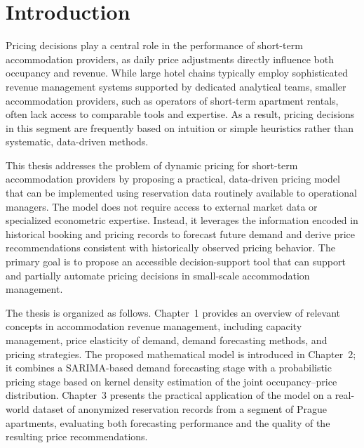 \chapter*{Introduction}

Pricing decisions play a central role in the performance of short-term accommodation providers, as daily price adjustments directly influence both occupancy and revenue. While large hotel chains typically employ sophisticated revenue management systems supported by dedicated analytical teams, smaller accommodation providers, such as operators of short-term apartment rentals, often lack access to comparable tools and expertise. As a result, pricing decisions in this segment are frequently based on intuition or simple heuristics rather than systematic, data-driven methods.

This thesis addresses the problem of dynamic pricing for short-term accommodation providers by proposing a practical, data-driven pricing model that can be implemented using reservation data routinely available to operational managers. The model does not require access to external market data or specialized econometric expertise. Instead, it leverages the information encoded in historical booking and pricing records to forecast future demand and derive price recommendations consistent with historically observed pricing behavior. The primary goal is to propose an accessible decision-support tool that can support and partially automate pricing decisions in small-scale accommodation management.

The thesis is organized as follows. Chapter~1 provides an overview of relevant concepts in accommodation revenue management, including capacity management, price elasticity of demand, demand forecasting methods, and pricing strategies. The proposed mathematical model is introduced in Chapter~2; it combines a SARIMA-based demand forecasting stage with a probabilistic pricing stage based on kernel density estimation of the joint occupancy–price distribution. Chapter~3 presents the practical application of the model on a real-world dataset of anonymized reservation records from a segment of Prague apartments, evaluating both forecasting performance and the quality of the resulting price recommendations.